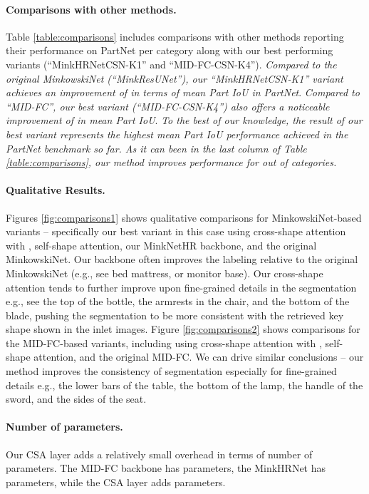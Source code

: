 \documentclass{egpubl}
\begin{document}
\paragraph*{Comparisons with other methods.}  Table \ref{table:comparisons} includes comparisons with other methods reporting their performance on PartNet per category
\cite{xu2018spidercnn,Qi17,li2021deepgcns_pami,Li:pointcnn,Liu:2020,Wang:2021}
along with our best performing variants (``MinkHRNetCSN-K1'' and ``MID-FC-CSN-K4''). 
\emph{Compared to the original MinkowskiNet (``MinkResUNet''), our 
``MinkHRNetCSN-K1'' variant achieves an improvement of  in terms of mean Part IoU in PartNet}. \emph{Compared to ``MID-FC'', our best variant (``MID-FC-CSN-K4'') also offers a noticeable improvement of  in mean Part IoU}. \emph{To the best of our knowledge, the result of our best variant represents the highest mean Part IoU performance achieved in the PartNet benchmark so far. As it can been in the last column of Table \ref{table:comparisons}, our method improves performance for  out of  categories.}

\vspace{-2.25mm}
\paragraph*{Qualitative Results.}
Figures \ref{fig:comparisons1} shows qualitative comparisons for MinkowskiNet-based variants -- specifically our best variant in this case using cross-shape attention with , self-shape attention, our MinkNetHR backbone, and the original MinkowskiNet. 
Our backbone often improves the labeling relative to the original MinkowskiNet (e.g., see bed mattress, or monitor base). 
Our cross-shape attention tends to further improve upon fine-grained details in the segmentation e.g., see the top of the bottle, the armrests in the chair, and the bottom of the blade, pushing the segmentation to be more consistent with the retrieved key shape shown in the inlet images. Figure \ref{fig:comparisons2} shows comparisons for the MID-FC-based variants, including using cross-shape attention with , self-shape attention, and the original MID-FC. We can drive similar conclusions -- our method improves the consistency of segmentation especially for fine-grained details e.g., the lower  bars of the table, the bottom of the lamp, the handle of the sword, and the sides of the seat. 

\vspace{-2.25mm}
\paragraph*{Number of parameters.} Our CSA layer adds a relatively small overhead in terms of number of parameters. The MID-FC backbone has  parameters, the MinkHRNet has  parameters, while the CSA layer adds  parameters.
\end{document}
